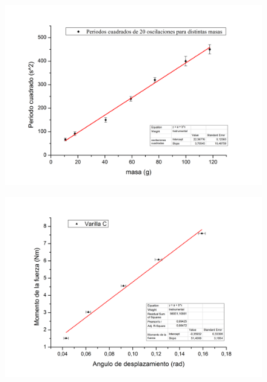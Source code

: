 \documentclass{article}
\begin{document}
     
     \begin{figure}
        \includegraphics[scale=0.5]{foto}
     \end{figure}
     
          \begin{figure}
        \includegraphics[scale=0.5]{foto_2}
     \end{figure}
     
     
\end{document}

